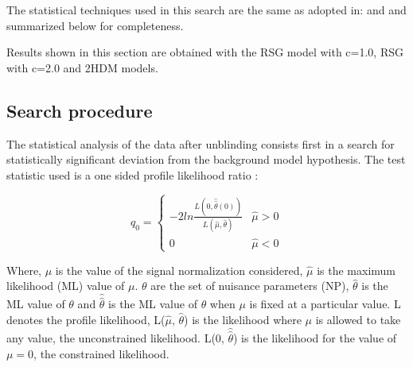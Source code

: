 \def\qmutilde{$\widetilde{q_{\mu}}$\xspace}
\def\muhat{$\hat{\mu}$\xspace}
\def\thetahat{$\hat{\theta}$\xspace}
\def\thetahathat{$\hat{\hat{\theta}}$\xspace}
\def\cls{$CL_{s}$\xspace}
\def\clsb{$CL_{s+b}$\xspace}
\def\clb{$CL_{b}$\xspace}

The statistical techniques used in this search are the same as adopted in: \cite{ATLASHHbbbb} and \cite{ATLAS-CONF-2016-017} and summarized below for completeness.

Results shown in this section are obtained with the RSG model with c=1.0, RSG with c=2.0 and 2HDM models.


\subsection{Search procedure}
\label{sec-search-procedure}
% 
%
The statistical analysis of the data after unblinding consists first in a search for statistically significant deviation from the background model hypothesis.  The test statistic used is a one sided profile likelihood ratio \cite{AsymLikelihood}:

\begin{equation}
  {q_{0}} =
  \begin{cases}
    -2ln \frac{L(0,\hat{\hat{\theta}}(0))}{L(\hat{\mu},\hat{\theta})} & \hat{\mu} > 0 \\
    0 & \hat{\mu} < 0
  \end{cases} 
\end{equation}

\noindent
Where, $\mu$ is the value of the signal normalization considered, \muhat is the maximum likelihood (ML)  value of $\mu$. $\theta$ are the set of nuisance parameters (NP), \thetahat is the ML value of $\theta$ and  \thetahathat is the ML value of $\theta$ when $\mu$ is fixed at a particular value. L denotes the profile likelihood, L(\muhat, \thetahat) is the likelihood where $\mu$ is allowed to take any value, the  unconstrained likelihood. L(0, \thetahathat) is the likelihood for the value of $\mu = 0$,  the constrained likelihood.

